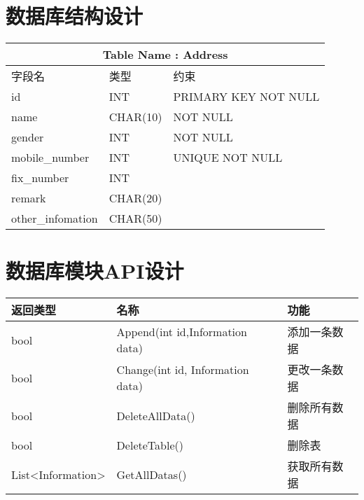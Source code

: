 \section{数据库结构设计}
	\begin{tabular}{|l|l|l|}
	    \hline
	    \multicolumn{3}{|c|}{Table Name : Address} \\
	    \hline
	    字段名 & 类型 & 约束 \\
	    \hline
	    id & INT & PRIMARY KEY NOT NULL \\
	    name & CHAR(10) & NOT NULL \\
	    gender & INT & NOT NULL \\
	    mobile\_number & INT & UNIQUE NOT NULL \\
	    fix\_number & INT & \\
	    remark & CHAR(20) &  \\
	    other\_infomation & CHAR(50) & \\
	    \hline
	\end{tabular}
\section{数据库模块API设计}
	\begin{tabular}{|l|l|l|}
	    \hline
	    返回类型 & 名称 & 功能 \\
	    \hline
	    bool & Append(int id,Information data) & 添加一条数据 \\
	    bool & Change(int id, Information data) & 更改一条数据 \\
	    bool & DeleteAllData() & 删除所有数据 \\
	    bool & DeleteTable() & 删除表 \\
	    List<Information> & GetAllDatas() & 获取所有数据 \\
	    \hline
	\end{tabular}